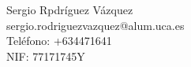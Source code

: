 Sergio Rpdríguez Vázquez \\ %
sergio.rodriguezvazquez@alum.uca.es \\ %
Teléfono: +634471641 \\ %
NIF: 77171745Y \\ %
